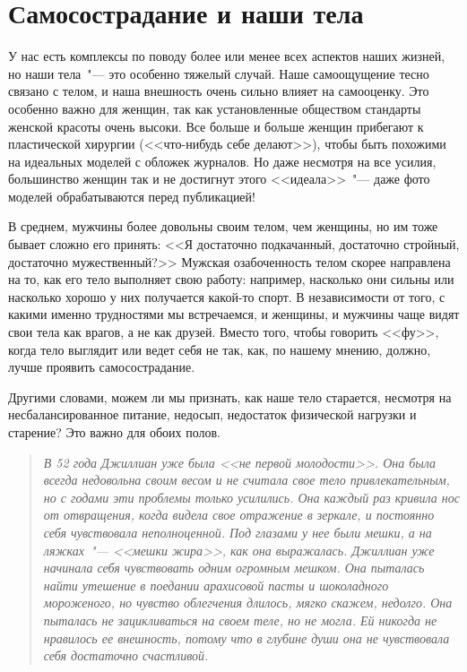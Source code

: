 
\chapter{Самосострадание и наши тела} \label{Self-Compassion_and_Our_Bodies}

У нас есть комплексы по поводу более или менее всех аспектов наших жизней, но наши тела~"--- это особенно тяжелый случай. Наше самоощущение тесно связано с телом, и наша внешность очень сильно влияет на самооценку. Это особенно важно для женщин, так как установленные обществом стандарты женской красоты очень высоки\cite{77}. Все больше и больше женщин прибегают к пластической хирургии (<<что-нибудь себе делают>>), чтобы быть похожими на идеальных моделей с обложек журналов. Но даже несмотря на все усилия, большинство женщин так и не достигнут этого <<идеала>>~"--- даже фото моделей обрабатываются перед публикацией!

В среднем, мужчины более довольны своим телом, чем женщины, но им тоже бывает сложно его принять: <<Я достаточно подкачанный, достаточно стройный, достаточно мужественный?>> Мужская озабоченность телом скорее направлена на то, как его тело выполняет свою работу: например, насколько они сильны или насколько хорошо у них получается какой-то спорт. В независимости от того, с какими именно трудностями мы встречаемся, и женщины, и мужчины чаще видят свои тела как врагов, а не как друзей. Вместо того, чтобы говорить <<фу>>, когда тело выглядит или ведет себя не так, как, по нашему мнению, должно, лучше проявить самосострадание. 

Другими словами, можем ли мы признать, как наше тело старается, несмотря на несбалансированное питание, недосып, недостаток физической нагрузки и старение? Это важно для обоих полов. 

\begin{quotation}
	\textit{
		В 52 года Джиллиан уже была <<не первой молодости>>. Она была всегда недовольна своим весом и не считала свое тело привлекательным, но с годами эти проблемы только усилились. Она каждый раз кривила нос от отвращения, когда видела свое отражение в зеркале, и постоянно себя чувствовала неполноценной. Под глазами у нее были мешки, а на ляжках~"--- <<мешки жира>>, как она выражалась. Джиллиан уже начинала себя чувствовать одним огромным мешком. Она пыталась найти утешение в поедании арахисовой пасты и шоколадного мороженого, но чувство облегчения длилось, мягко скажем, недолго. Она пыталась не зацикливаться на своем теле, но не могла. Ей никогда не нравилось ее внешность, потому что в глубине души она не чувствовала себя достаточно счастливой.
	}
\end{quotation}

